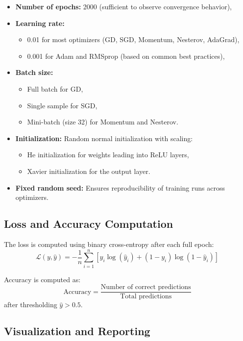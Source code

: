\documentclass[12pt]{article}
\begin{document}
\begin{itemize}
    \item \textbf{Number of epochs:} 2000 (sufficient to observe convergence behavior),
    \item \textbf{Learning rate:} 
    \begin{itemize}
        \item 0.01 for most optimizers (GD, SGD, Momentum, Nesterov, AdaGrad),
        \item 0.001 for Adam and RMSprop (based on common best practices),
    \end{itemize}
    \item \textbf{Batch size:} 
    \begin{itemize}
        \item Full batch for GD,
        \item Single sample for SGD,
        \item Mini-batch (size 32) for Momentum and Nesterov.
    \end{itemize}
    \item \textbf{Initialization:} Random normal initialization with scaling:
    \begin{itemize}
        \item He initialization for weights leading into ReLU layers,
        \item Xavier initialization for the output layer.
    \end{itemize}
    \item \textbf{Fixed random seed:} Ensures reproducibility of training runs across optimizers.
\end{itemize}

\subsection{Loss and Accuracy Computation}

The loss is computed using binary cross-entropy after each full epoch:
\[
\mathcal{L}(y, \hat{y}) = -\frac{1}{n} \sum_{i=1}^{n} \left[ y_i \log(\hat{y}_i) + (1 - y_i) \log(1 - \hat{y}_i) \right]
\]

Accuracy is computed as:
\[
\text{Accuracy} = \frac{\text{Number of correct predictions}}{\text{Total predictions}}
\]
after thresholding $\hat{y} > 0.5$.

\subsection{Visualization and Reporting}
\end{document}
